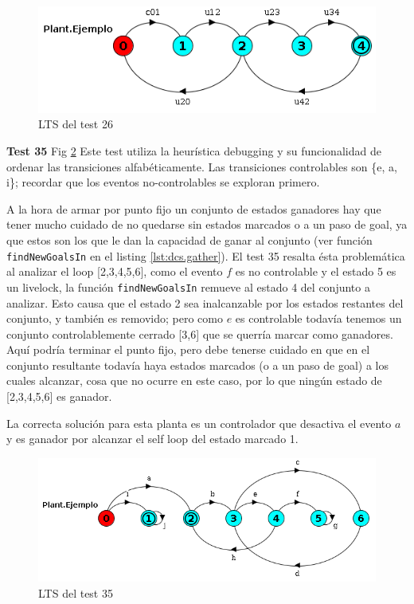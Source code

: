 \begin{figure}[h]
 \centering
 \includegraphics[scale=0.7]{figures/tests/test26.png}
 \caption{LTS del test 26}
 \label{fig:test26}
\end{figure}

\FloatBarrier
\textbf{Test 35} Fig \ref{fig:test35} 
Este test utiliza la heurística debugging y su funcionalidad de ordenar las transiciones alfabéticamente. Las transiciones controlables son \{e, a, i\}; recordar que los eventos no-controlables se exploran primero.

A la hora de armar por punto fijo un conjunto de estados ganadores hay que tener mucho cuidado de no quedarse sin estados marcados o a un paso de goal, ya que estos son los que le dan la capacidad de ganar al conjunto (ver función \texttt{findNewGoalsIn} en el listing \ref{lst:dcs.gather}). El test 35 resalta ésta problemática al analizar el loop [2,3,4,5,6], como el evento $f$ es no controlable y el estado 5 es un livelock, la función \texttt{findNewGoalsIn} remueve al estado 4 del conjunto a analizar. Esto causa que el estado 2 sea inalcanzable por los estados restantes del conjunto, y también es removido; pero como $e$ es controlable todavía tenemos un conjunto controlablemente cerrado [3,6] que se querría marcar como ganadores. Aquí podría terminar el punto fijo, pero debe tenerse cuidado en que en el conjunto resultante todavía haya estados marcados (o a un paso de goal) a los cuales alcanzar, cosa que no ocurre en este caso, por lo que ningún estado de [2,3,4,5,6] es ganador.

La correcta solución para esta planta es un controlador que desactiva el evento $a$ y es ganador por alcanzar el self loop del estado marcado 1.

\begin{figure}[h]
 \centering
 \includegraphics[scale=0.7]{figures/tests/test35.png}
 \caption{LTS del test 35}
 \label{fig:test35}
\end{figure}

